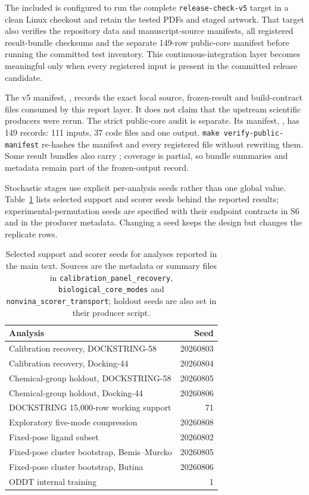 The included  is configured to run the complete
\texttt{release-check-v5} target in a clean Linux checkout and retain the tested PDFs and staged
artwork. That target also verifies the repository data and manuscript-source manifests, all
registered result-bundle checksums and the separate 149-row public-core manifest before running
the committed test inventory. This continuous-integration layer becomes meaningful only when
every registered input is present in the committed release candidate.

The v5 manifest, , records the exact local source,
frozen-result and build-contract files consumed by this report layer. It does not claim that the
upstream scientific producers were rerun. The strict public-core audit is separate. Its manifest,
, has 149 records: 111 inputs, 37 code files and one
output. \texttt{make verify-public-manifest} re-hashes the manifest and every registered file
without rewriting them. Some result bundles also carry ; coverage is
partial, so bundle summaries and metadata remain part of the frozen-output record.

Stochastic stages use explicit per-analysis seeds rather than one global value.
Table~\ref{tab:s7seeds} lists selected support and scorer seeds behind the reported results;
experimental-permutation seeds are specified with their endpoint contracts in S6 and in the
producer metadata. Changing a seed keeps the design but changes the replicate rows.

\begin{table}[htbp]
\centering
\caption{Selected support and scorer seeds for analyses reported in the main text. Sources are the metadata or
summary files in \texttt{calibration\_panel\_recovery}, \texttt{biological\_core\_modes} and
\texttt{nonvina\_scorer\_transport}; holdout seeds are also set in their producer script.}
\label{tab:s7seeds}
\small
\begin{tabular}{lr}
\toprule
Analysis & Seed \\
\midrule
Calibration recovery, DOCKSTRING-58 & 20260803 \\
Calibration recovery, Docking-44 & 20260804 \\
Chemical-group holdout, DOCKSTRING-58 & 20260805 \\
Chemical-group holdout, Docking-44 & 20260806 \\
DOCKSTRING 15{,}000-row working support & 71 \\
Exploratory five-mode compression & 20260808 \\
Fixed-pose ligand subset & 20260802 \\
Fixed-pose cluster bootstrap, Bemis--Murcko & 20260805 \\
Fixed-pose cluster bootstrap, Butina & 20260806 \\
ODDT internal training & 1 \\
\bottomrule
\end{tabular}
\end{table}

